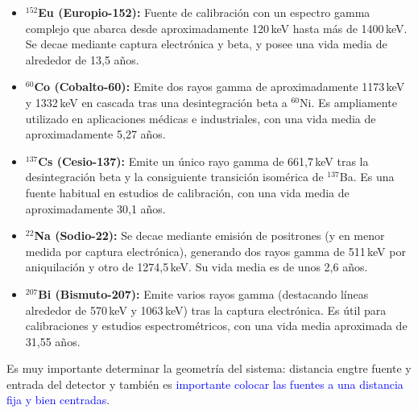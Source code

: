 \documentclass[11pt]{article}
\begin{document}
\begin{itemize}
    \item \textbf{\(^{152}\)Eu (Europio-152):} Fuente de calibración con un espectro gamma complejo que abarca desde aproximadamente 120\,keV hasta más de 1400\,keV. Se decae mediante captura electrónica y beta, y posee una vida media de alrededor de 13,5 años.
    \item \textbf{\(^{60}\)Co (Cobalto-60):} Emite dos rayos gamma de aproximadamente 1173\,keV y 1332\,keV en cascada tras una desintegración beta a \(^{60}\)Ni. Es ampliamente utilizado en aplicaciones médicas e industriales, con una vida media de aproximadamente 5,27 años.
    \item \textbf{\(^{137}\)Cs (Cesio-137):} Emite un único rayo gamma de 661,7\,keV tras la desintegración beta y la consiguiente transición isomérica de \(^{137}\)Ba. Es una fuente habitual en estudios de calibración, con una vida media de aproximadamente 30,1 años.
    \item \textbf{\(^{22}\)Na (Sodio-22):} Se decae mediante emisión de positrones (y en menor medida por captura electrónica), generando dos rayos gamma de 511\,keV por aniquilación y otro de 1274,5\,keV. Su vida media es de unos 2,6 años. 
    \item \textbf{\(^{207}\)Bi (Bismuto-207):} Emite varios rayos gamma (destacando líneas alrededor de 570\,keV y 1063\,keV) tras la captura electrónica. Es útil para calibraciones y estudios espectrométricos, con una vida media aproximada de 31,55 años.
\end{itemize}
Es muy \textcolor{BrickRed}{importante determinar la geometría del sistema: distancia engtre fuente y entrada del detector} y también es \textcolor{Blue}{importante colocar las fuentes a una distancia fija y bien centradas}.
\end{document}
